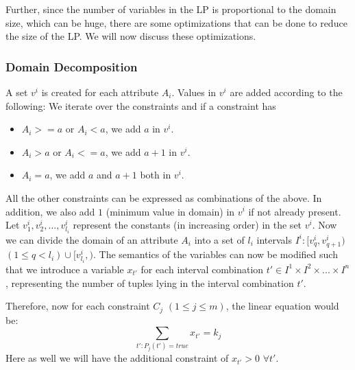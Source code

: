 \documentclass[]{article}
\begin{document}
\begin{multicols}{2}
			Further, since the number of variables in the LP is proportional to the domain size, which can be huge, there are some optimizations that can be done to reduce the size of the LP. 
			We will now discuss these optimizations.
	
	
			\subsubsection{Domain Decomposition}
			A set $v^{i}$ is created for each attribute $A_{i}$. 
			Values in  $v^{i}$ are added according to the following: 
			We iterate over the constraints and if a constraint has
			
			\begin{itemize}
				\item $A_{i} >= a$ or $A_{i} < a$, we add $a$ in  $v^{i}$.
				\item $A_{i} > a$ or  $A_{i} <= a$, we add $a + 1$ in $v^{i}$.
				\item $A_{i} = a$, we add $a$ and $a+1$ both in $v^{i}$.
			\end{itemize}
			
			All the other constraints can be expressed as combinations of the above. 
			In addition, we also add $1$ (minimum value in domain) in $v^{i}$ if not already present. 
			Let  $v_{1}^{i}, v_{2}^{i},...,v_{l_{i}}^{i}$ represent the constants (in increasing order) in the set $v^{i}$. 
			Now we can divide the domain of an attribute $A_{i}$ into a set of $l_{i}$ intervals $I^{i}: [v_{q}^{i},v_{q+1}^{i})$ $(1 \leq q < l_{i}) \cup [v_{l_{i}}^{i},)$. 
			The semantics of the variables can now be modified such that we introduce a variable $x_{t'}$ for each interval combination $t' \in I^{1} \times I^{2} \times ... \times I^{n}$, representing the number of tuples lying in the interval combination $t'$.
			
			Therefore, now for each constraint $C_{j}$ $(1 \leq j \leq m)$, the linear equation would be:
			\begin{equation*}
				\sum_{t':P_{j}(t')=true} x_{t'} = k_{j}
			\end{equation*}
			Here as well we will have the additional constraint of $x_{t'} > 0$ $\forall t'$.
			

\end{multicols}
\end{document}
